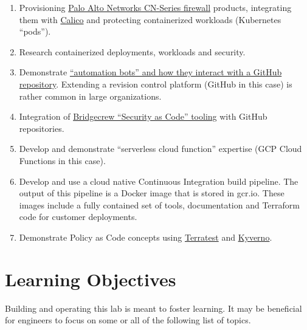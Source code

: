 \begin{raggedright}
	\begin{enumerate}
		\item Provisioning \href{https://docs.paloaltonetworks.com/cn-series.html}{Palo Alto Networks CN-Series firewall} products, integrating
		      them with \href{https://www.tigera.io/project-calico/}{Calico} and protecting containerized workloads (Kubernetes ``pods'').
		\item Research containerized deployments, workloads and security.
		\item Demonstrate \href{https://github.com/probot/probot}{``automation bots'' and how they interact with a GitHub repository}. Extending a
		      revision control platform (GitHub in this case) is rather common in large organizations.
		\item Integration of \href{https://docs.bridgecrew.io/docs}{Bridgecrew ``Security as Code'' tooling} with GitHub repositories.
		\item Develop and demonstrate ``serverless cloud function'' expertise (GCP Cloud Functions in this case).
		\item Develop and use a cloud native Continuous Integration build pipeline. The output of this pipeline is a Docker image that is stored
		      in gcr.io. These images include a fully contained set of tools, documentation and Terraform code for customer deployments.
		\item Demonstrate Policy as Code concepts using \href{https://www.accurics.com/products/terrascan/}{Terratest} and
		      \href{https://kyverno.io/}{Kyverno}.
	\end{enumerate}
\end{raggedright}
\vspace{2mm}


\section{\label{sec:LO}Learning Objectives}
\vspace{2mm}

\justifying
Building and operating this lab is meant to foster learning. It may be beneficial for engineers to focus on some or all of the
following list of topics.

